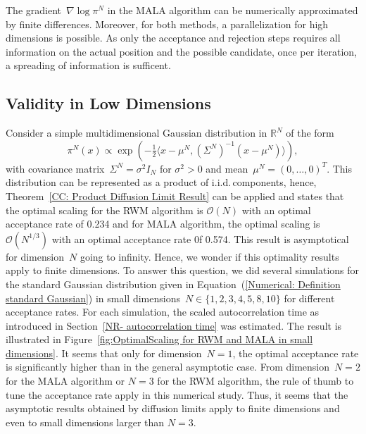 \begin{rem}
 The gradient~$\nabla \log \pi^{N}$ in the MALA algorithm can be numerically approximated by finite differences. Moreover, for both methods, a parallelization for high dimensions is possible. As only the acceptance and rejection steps requires all information on the actual position and the possible candidate, once per iteration, a spreading of information is sufficent.
\end{rem}


\subsection{Validity in Low Dimensions}

Consider a simple multidimensional Gaussian distribution in $\mathbb{R}^N$  of the form
\begin{equation}
 \label{Numerical: Definition standard Gaussian}
 \pi^N (x) \varpropto \exp \left( -\tfrac{1}{2} \langle x - \mu^N, (\Sigma^N)^{-1} (x-\mu^N) \rangle  \right),
\end{equation}
with covariance matrix~$\Sigma^N = \sigma^2 I_N$ for $\sigma^2 >0$ and mean~$\mu^N = (0, \dots, 0)^T$. This distribution can be represented as a product of i.i.d.\,components, hence, Theorem~\ref{CC: Product Diffusion Limit Result} can be applied and states that the optimal scaling for the RWM algorithm is $\mathcal{O}(N)$ with an optimal acceptance rate of 0.234 and for MALA algorithm, the optimal scaling is $\mathcal{O}(N^{1/3})$ with an optimal acceptance rate 0f 0.574. This result is asymptotical for dimension~$N$ going to infinity. Hence, we wonder if this optimality results apply to finite dimensions. To answer this question, we did several simulations for the standard Gaussian distribution given in Equation~(\ref{Numerical: Definition standard Gaussian}) in small dimensions~$N \in \{ 1,2,3,4,5,8,10 \}$ for different acceptance rates. For each simulation, the scaled autocorrelation time as introduced in Section~\ref{NR- autocorrelation time} was estimated. The result is illustrated in Figure~\ref{fig:OptimalScaling for RWM and MALA in small dimensions}. It seems that only for dimension~$N=1$, the optimal acceptance rate is significantly higher than in the general asymptotic case. From dimension~$N=2$ for the MALA algorithm or $N=3$ for the RWM algorithm, the rule of thumb to tune the acceptance rate apply in this numerical study. Thus, it seems that the asymptotic results obtained by diffusion limits apply to finite dimensions and even to small dimensions larger than $N=3$. 

